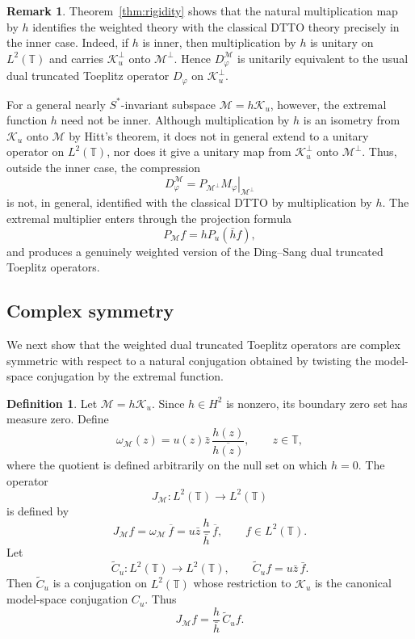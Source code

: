 \documentclass[12pt]{amsart}
\theoremstyle{definition}
\newtheorem{definition}[theorem]{Definition}
\newtheorem{remark}[theorem]{Remark}
\theoremstyle{remark}
\def \T{\mathbb{T}}
\newcommand{\clm}{\mathcal{M}}
\newcommand{\clk}{\mathcal{K}}
\newcommand{\vp}{\varphi}
\newcommand\restr[2]{\ensuremath{\left.#1\right|_{#2}}}
\numberwithin{equation}{section}
\begin{document}
\begin{remark}
Theorem~\ref{thm:rigidity} shows that the natural multiplication map by $h$ identifies the weighted theory with the classical DTTO theory precisely in the inner case. Indeed, if $h$ is inner, then multiplication by $h$ is unitary on $L^2(\T)$ and carries $\clk_u^\perp$ onto $\clm^\perp$. Hence $D_\vp^\clm$ is unitarily equivalent to the usual dual truncated Toeplitz operator $D_\vp$ on $\clk_u^\perp$.

For a general nearly $S^*$-invariant subspace $\clm=h\clk_u$, however, the extremal function $h$ need not be inner. Although multiplication by $h$ is an isometry from $\clk_u$ onto $\clm$ by Hitt's theorem, it does not in general extend to a unitary operator on $L^2(\T)$, nor does it give a unitary map from $\clk_u^\perp$ onto $\clm^\perp$. Thus, outside the inner case, the compression
\[
D_\vp^\clm=\restr{P_{\clm^\perp}M_\vp}{\clm^\perp}
\]
is not, in general, identified with the classical DTTO by multiplication by $h$. The extremal multiplier enters through the projection formula
\[
P_\clm f=hP_u(\bar h f),
\]
and produces a genuinely weighted version of the Ding--Sang dual
truncated Toeplitz operators.
\end{remark}

\subsection{Complex symmetry}

We next show that the weighted dual truncated Toeplitz operators are complex symmetric with respect to a natural conjugation obtained by twisting the model-space conjugation by the extremal function.

\begin{definition}
Let $\clm=h\clk_u$. Since $h\in H^2$ is nonzero, its boundary zero set has measure zero. Define
\[
\omega_\clm(z)
= u(z)\bar z\,\frac{h(z)}{\overline{h(z)}},
\qquad z\in\T,
\]
where the quotient is defined arbitrarily on the null set on which $h=0$. The operator
\[
J_\clm:L^2(\T)\to L^2(\T)
\]
is defined by
\[
J_\clm f
=
\omega_\clm\,\overline{f}
=
u\bar{z}\,\frac{h}{\bar h}\,\overline{f},
\qquad f\in L^2(\T).
\]
Let
\[
\widetilde C_u:L^2(\T)\to L^2(\T),
\qquad
\widetilde C_u f=u\bar z\,\bar f.
\]
Then $\widetilde C_u$ is a conjugation on $L^2(\T)$ whose restriction to $\clk_u$ is the canonical model-space conjugation $C_u$. Thus
\[
J_\clm f
=
\frac{h}{\bar h}\,\widetilde C_u f.
\]
\end{definition}
\end{document}
